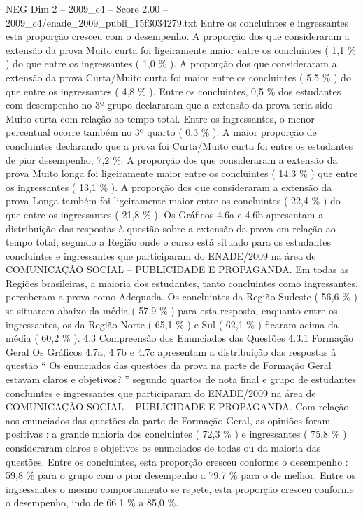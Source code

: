 \begin{textsample}{NEG Dim 2 – 2009\_c4 – Score 2.00 – 2009\_c4/enade\_2009\_publi\_15f3034279.txt}
Entre os concluintes e ingressantes esta proporção cresceu com o desempenho.
A proporção dos que consideraram a extensão da prova Muito curta foi ligeiramente maior entre os concluintes ( 1,1 \% ) do que entre os ingressantes ( 1,0 \% ).
A proporção dos que consideraram a extensão da prova Curta/Muito curta foi maior entre os concluintes ( 5,5 \% ) do que entre os ingressantes ( 4,8 \% ).
Entre os concluintes, 0,5 \% dos estudantes com desempenho no 3º grupo declararam que a extensão da prova teria sido Muito curta com relação ao tempo total.
Entre os ingressantes, o menor percentual ocorre também no 3º quarto ( 0,3 \% ).
A maior proporção de concluintes declarando que a prova foi Curta/Muito curta foi entre os estudantes de pior desempenho, 7,2 \%.
A proporção dos que consideraram a extensão da prova Muito longa foi ligeiramente maior entre os concluintes ( 14,3 \% ) que entre os ingressantes ( 13,1 \% ).
A proporção dos que consideraram a extensão da prova Longa também foi ligeiramente maior entre os concluintes ( 22,4 \% ) do que entre os ingressantes ( 21,8 \% ).
Os Gráficos 4.6a e 4.6b apresentam a distribuição das respostas à questão sobre a extensão da prova em relação ao tempo total, segundo a Região onde o curso está situado para os estudantes concluintes e ingressantes que participaram do ENADE/2009 na área de COMUNICAÇÃO SOCIAL – PUBLICIDADE E PROPAGANDA.
Em todas as Regiões brasileiras, a maioria dos estudantes, tanto concluintes como ingressantes, perceberam a prova como Adequada.
Os concluintes da Região Sudeste ( 56,6 \% ) se situaram abaixo da média ( 57,9 \% ) para esta resposta, enquanto entre os ingressantes, os da Região Norte ( 65,1 \% ) e Sul ( 62,1 \% ) ficaram acima da média ( 60,2 \% ). 4.3 Compreensão dos Enunciados das Questões 4.3.1 Formação Geral Os Gráficos 4.7a, 4.7b e 4.7c apresentam a distribuição das respostas à questão “ Os enunciados das questões da prova na parte de Formação Geral estavam claros e objetivos? ” segundo quartos de nota final e grupo de estudantes concluintes e ingressantes que participaram do ENADE/2009 na área de COMUNICAÇÃO SOCIAL – PUBLICIDADE E PROPAGANDA.
Com relação aos enunciados das questões da parte de Formação Geral, as opiniões foram positivas : a grande maioria dos concluintes ( 72,3 \% ) e ingressantes ( 75,8 \% ) consideraram claros e objetivos os enunciados de todas ou da maioria das questões.
Entre os concluintes, esta proporção cresceu conforme o desempenho : 59,8 \% para o grupo com o pior desempenho a 79,7 \% para o de melhor.
Entre os ingressantes o mesmo comportamento se repete, esta proporção cresceu conforme o desempenho, indo de 66,1 \% a 85,0 \%.

\end{textsample}
